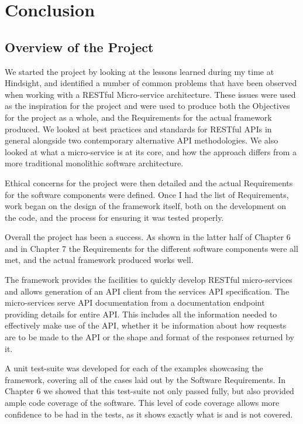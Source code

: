 \chapter{Conclusion}
\section{Overview of the Project}

We started the project by looking at the lessons learned during my time at Hindsight, and identified a number of common problems that have been observed when working with a RESTful Micro-service architecture. These issues were used as the inspiration for the project and were used to produce both the Objectives for the project as a whole, and the Requirements for the actual framework produced. We looked at best practices and standards for RESTful APIs in general alongside two contemporary alternative API methodologies. We also looked at what a micro-service is at its core, and how the approach differs from a more traditional monolithic software architecture.

Ethical concerns for the project were then detailed and the actual Requirements for the software components were defined. Once I had the list of Requirements, work began on the design of the framework itself, both on the development on the code, and the process for ensuring it was tested properly.

Overall the project has been a success. As shown in the latter half of Chapter 6 and in Chapter 7 the Requirements for the different software components were all met, and the actual framework produced works well. 

The framework provides the facilities to quickly develop RESTful micro-services and allows generation of an API client from the services API specification. The micro-services serve API documentation from a documentation endpoint providing details for entire API. This includes all the information needed to effectively make use of the API, whether it be information about how requests are to be made to the API or the shape and format of the responses returned by it.

A unit test-suite was developed for each of the examples showcasing the framework, covering all of the cases laid out by the Software Requirements. In Chapter 6 we showed that this test-suite not only passed fully, but also provided ample code coverage of the software. This level of code coverage allows more confidence to be had in the tests, as it shows exactly what is and is not covered.

